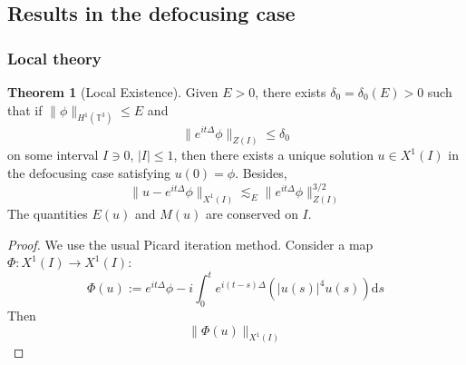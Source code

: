 \documentclass{article}
\theoremstyle{definition}
\newtheorem{theorem}[definition]{Theorem}
\theoremstyle{remark}
\newcommand{\dif}{\mathrm{d}}
\begin{document}
\subsection{Results in the defocusing case}
\subsubsection{Local theory}
\begin{theorem}[Local Existence]
Given $E>0$, there exists $\delta_0=\delta_0(E)>0$ such that if $\|\phi\|_{H^1(\mathbb{T}^3)}\le E$ and 
$$\|e^{it\Delta}\phi\|_{Z(I)}\le\delta_0$$
on some interval $I\ni0$, $|I|\le1$, then there exists a unique solution $u\in X^1(I)$ in the defocusing case satisfying $u(0)=\phi$. Besides, 
$$\|u-e^{it\Delta}\phi\|_{X^1(I)}\lesssim_E\|e^{it\Delta}\phi\|_{Z(I)}^{3/2}$$
The quantities $E(u)$ and $M(u)$ are conserved on $I$. 
\end{theorem}
\begin{proof}
We use the usual Picard iteration method. Consider a map $\Phi:X^1(I)\rightarrow X^1(I)$: 
$$\Phi(u):=e^{it\Delta}\phi-i\int_0^te^{i(t-s)\Delta}(|u(s)|^4u(s))\dif s$$
Then 
$$\|\Phi(u)\|_{X^1(I)}$$
\end{proof}
\end{document}
